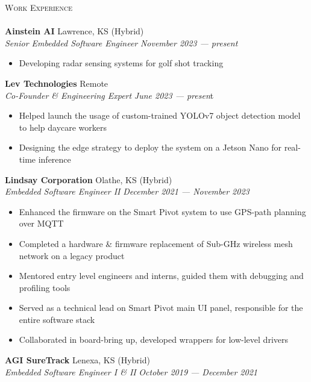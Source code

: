 \documentclass[a4paper]{article}
\newcommand{\lineunder} {
    \vspace*{-8pt} \\
    \hspace*{-18pt} \hrulefill \\
}
\newcommand{\header} [1] {
    {\hspace*{-18pt}\vspace*{6pt} \textsc{#1}}
    \vspace*{-6pt} \lineunder
}
\begin{document}
\header{Work Experience}
\vspace{1mm}
\textbf{Ainstein AI} \hfill Lawrence, KS (Hybrid)\\
\textit{Senior Embedded Software Engineer} \hfill \textit{November 2023 --- present}\\
\vspace{-1mm}
\begin{itemize}
    \item Developing radar sensing systems for golf shot tracking
\end{itemize}
\textbf{Lev Technologies} \hfill Remote\\
\textit{Co-Founder \& Engineering Expert} \hfill \textit{June 2023 --- presen}t\\
\vspace{-1mm}
\begin{itemize} \itemsep 1pt
    \item Helped launch the usage of custom-trained YOLOv7 object detection model to help daycare workers
    \item Designing the edge strategy to deploy the system on a Jetson Nano for real-time inference
\end{itemize}
\textbf{Lindsay Corporation} \hfill Olathe, KS (Hybrid)\\
\textit{Embedded Software Engineer II} \hfill \textit{December 2021 --- November 2023}\\
\vspace{-1mm}
\begin{itemize} \itemsep 1pt
    \item Enhanced the firmware on the Smart Pivot system to use GPS-path planning over MQTT
    \item Completed a hardware \& firmware replacement of Sub-GHz wireless mesh network on a legacy product
    \item Mentored entry level engineers and interns, guided them with debugging and profiling tools
    \item Served as a technical lead on Smart Pivot main UI panel, responsible for the entire software stack
    \item Collaborated in board-bring up, developed wrappers for low-level drivers
\end{itemize}
\textbf{AGI SureTrack} \hfill Lenexa, KS (Hybrid)\\
\textit{Embedded Software Engineer I \& II} \hfill \textit{October 2019 --- December 2021}\\
\vspace{-1mm}
\end{document}
